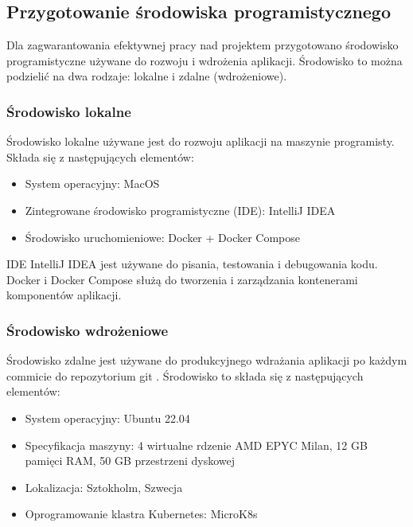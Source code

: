 \subsection{Przygotowanie środowiska programistycznego}

Dla zagwarantowania efektywnej pracy nad projektem przygotowano środowisko programistyczne używane do rozwoju i wdrożenia aplikacji. Środowisko to można podzielić na dwa rodzaje: lokalne i zdalne (wdrożeniowe).

\subsubsection{Środowisko lokalne}

Środowisko lokalne używane jest do rozwoju aplikacji na maszynie programisty. Składa się z następujących elementów:

\begin{itemize}
    \item System operacyjny: MacOS
    \item Zintegrowane środowisko programistyczne (IDE): IntelliJ IDEA \cite{intellij}
    \item Środowisko uruchomieniowe: Docker + Docker Compose \cite{dockercompose}
\end{itemize}

IDE IntelliJ IDEA jest używane do pisania, testowania i debugowania kodu. Docker i Docker Compose służą do tworzenia i zarządzania kontenerami komponentów aplikacji.

\subsubsection{Środowisko wdrożeniowe}

Środowisko zdalne jest używane do produkcyjnego wdrażania aplikacji po każdym commicie do repozytorium git \cite{git}. Środowisko to składa się z następujących elementów:

\begin{itemize}
    \item System operacyjny: Ubuntu 22.04 \cite{ubuntu2204}
    \item Specyfikacja maszyny: 4 wirtualne rdzenie AMD EPYC Milan, 12 GB pamięci RAM, 50 GB przestrzeni dyskowej
    \item Lokalizacja: Sztokholm, Szwecja
    \item Oprogramowanie klastra Kubernetes: MicroK8s \cite{microk8s}
\end{itemize}

